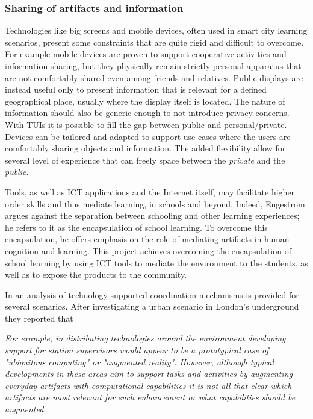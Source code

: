 \subsubsection{Sharing of artifacts and information}
Technologies like big screens and mobile devices, often used in smart city learning scenarios, present some constraints that are quite rigid and difficult to overcome. For example mobile devices are proven to support cooperative activities and information sharing, but they physically remain strictly personal apparatus that are not comfortably shared even among friends and relatives.
Public displays are instead useful only to present information that is relevant for a defined geographical place, usually where the display itself is located. The nature of information should also be generic enough to not introduce privacy concerns.
With TUIs it is possible to fill the gap between public and personal/private. Devices can be tailored and adapted to support use cases where the users are comfortably sharing objects and information.
The added flexibility allow for several level of experience that can freely space between the \textit{private} and the \textit{public}.


Tools, as well as ICT applications and the Internet itself, may facilitate higher order skills and thus mediate learning, in schools and beyond\cite{kashdan_outdoors_2013}. Indeed, Engestrom\cite{engestrom_non_1991} argues against the separation between schooling and other learning experiences; he refers to it as the encapsulation of school learning. To overcome this encapsulation, he offers emphasis on the role of mediating artifacts in human cognition and learning.
This project achieves overcoming the encapsulation of school learning by using ICT tools to mediate the environment to the students, as well as to expose the products to the community\cite{kashdan_outdoors_2013}.

In \cite{luff_mobility_1998} an analysis of technology-supported coordination mechanisms is provided for several scenarios.
After investigating a urban scenario in London's underground they reported that 

\textit{For example, in distributing technologies around the environment developing support for station supervisors would appear to be a prototypical case of "ubiquitous computing" or
"augmented reality". However, although typical developments in these areas aim to support tasks and activities by augmenting everyday artifacts with computational capabilities it is not all that clear which artifacts are most relevant for such enhancement or what capabilities should be augmented}

